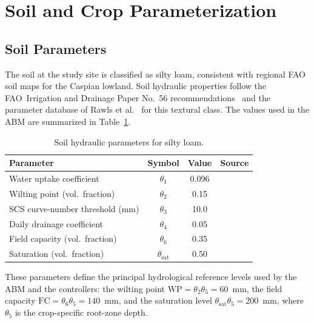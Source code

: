 \section{Soil and Crop Parameterization}
\label{sec:sys-params}

\subsection{Soil Parameters}
\label{ssec:sys-soil}

The soil at the study site is classified as silty loam, consistent with
regional FAO soil maps for the Caspian lowland. Soil hydraulic properties
follow the FAO~Irrigation and Drainage Paper No.~56
recommendations~\cite{allen1998} and the parameter database of
Rawls et al.~\cite{rawls1982} for this textural class. The values used
in the ABM are summarized in Table~\ref{tab:soil-params}.

\begin{table}[h]
\centering
\caption{Soil hydraulic parameters for silty loam.}
\label{tab:soil-params}
\begin{tabular}{lccl}
\toprule
\textbf{Parameter} & \textbf{Symbol} & \textbf{Value} & \textbf{Source} \\
\midrule
Water uptake coefficient            & $\theta_1$    & 0.096  & \cite{Lopezjimenez2024} \\
Wilting point (vol.\ fraction)      & $\theta_2$    & 0.15   & \cite{allen1998} \\
SCS curve-number threshold (mm)     & $\theta_3$    & 10.0   & \cite{Lopezjimenez2024} \\
Daily drainage coefficient          & $\theta_4$    & 0.05   & \cite{Lopezjimenez2024} \\
Field capacity (vol.\ fraction)     & $\theta_6$    & 0.35   & \cite{allen1998} \\
Saturation (vol.\ fraction)         & $\theta_{\mathrm{sat}}$ & 0.50 & \cite{rawls1982} \\
\bottomrule
\end{tabular}
\end{table}

These parameters define the principal hydrological reference levels used
by the ABM and the controllers: the wilting point
$\mathrm{WP} = \theta_2 \theta_5 = 60$~mm, the field capacity
$\mathrm{FC} = \theta_6 \theta_5 = 140$~mm, and the saturation level
$\theta_{\mathrm{sat}} \theta_5 = 200$~mm, where $\theta_5$ is the
crop-specific root-zone depth.

